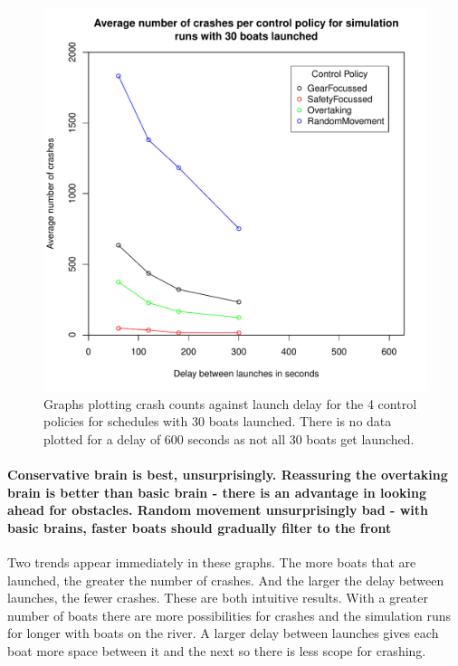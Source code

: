   \begin{figure}
  \begin{center}
    \includegraphics[scale=0.8]{"images/graphs/Average number of crashes per control policy for simulation runs with 30 boats launched"}
    \caption{Graphs plotting crash counts against launch delay for the 4 control policies for schedules with 30 boats launched. There is no data plotted for a delay of 600 seconds as not all 30 boats get launched.}
    \label{experiments:fig:crash_counts_30_launches}
  \end{center}
  \end{figure}
  
  \paragraph{Conservative brain is best, unsurprisingly. Reassuring the overtaking brain is better than basic brain - there is an advantage in looking ahead for obstacles. Random movement unsurprisingly bad - with basic brains, faster boats should gradually filter to the front}
  Two trends appear immediately in these graphs. The more boats that are launched, the greater the number of crashes. And the larger the delay between launches, the fewer crashes. These are both intuitive results. With a greater number of boats there are more possibilities for crashes and the simulation runs for longer with boats on the river. A larger delay between launches gives each boat more space between it and the next so there is less scope for crashing.
  
